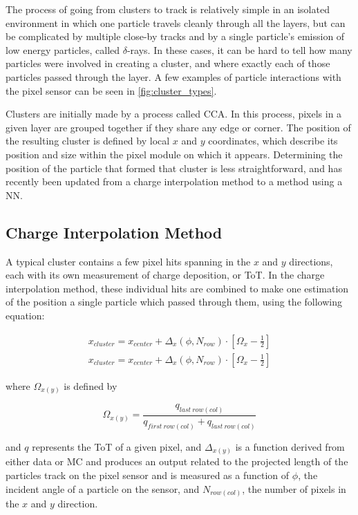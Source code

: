 The process of going from clusters to track is relatively simple in an isolated environment in which one particle travels cleanly through all the layers, but can be complicated by multiple close-by tracks and by a single particle's emission of low energy particles, called $\delta$-rays. In these cases, it can be hard to tell how many particles were involved in creating a cluster, and where exactly each of those particles passed through the layer. A few examples of particle interactions with the pixel sensor can be seen in \autoref{fig:cluster_types}. 

Clusters are initially made by a process called \acf{CCA}. In this process, pixels in a given layer are grouped together if they share any edge or corner. The position of the resulting cluster is defined by local $x$ and $y$ coordinates, which describe its position and size within the pixel module on which it appears. Determining the position of the particle that formed that cluster is less straightforward, and has recently been updated from a charge interpolation method to a method using a \ac{NN}. 

\subsection{Charge Interpolation Method}

A typical cluster contains a few pixel hits spanning in the $x$ and $y$ directions, each with its own measurement of charge deposition, or \ac{ToT}. In the charge interpolation method, these individual hits are combined to make one estimation of the position a single particle which passed through them, using the following equation: 

\begin{eqnarray}
x_{cluster} = x_{center} + \Delta_x(\phi,N_{row}) \cdot \left[ \Omega_x -\frac{1}{2} \right] \\
\label{eq:analogx}
x_{cluster} = x_{center} + \Delta_x(\phi,N_{row}) \cdot \left[ \Omega_x -\frac{1}{2} \right]
\label{eq:analogy}
\end{eqnarray}

where $\Omega_{x(y)}$ is defined by

\begin{equation}
\Omega_{x(y)} = \frac{q_{last~row(col)}}{q_{first~row(col)} + q_{last~row(col)}}
\end{equation}

and $q$ represents the \ac{ToT} of a given pixel, and $\Delta_{x(y)}$ is a function derived from either data or \ac{MC} and produces an output related to the projected length of the particles track on the pixel sensor and is measured as a function of $\phi$, the incident angle of a particle on the sensor, and $N_{row(col)}$, the number of pixels in the $x$ and $y$ direction. 

